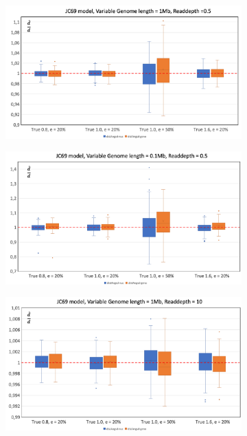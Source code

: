\documentclass{article}
\begin{document}
\begin{figure}
\begin{subfigure}{.5\textwidth}
  \centering
  \includegraphics[width=.99\linewidth]{BiasJCRD05_1M.png}  
  \caption{}
  \label{fig:BiasJCRD05_1M}
\end{subfigure}
\begin{subfigure}{.5\textwidth}
  \centering
  \includegraphics[width=.99\linewidth]{BiasJCRD05_01M.png}  
  \caption{}
  \label{fig:BiasJCRD05_01M}
\end{subfigure}
\newline
\begin{subfigure}{.5\textwidth}
  \centering
  \includegraphics[width=.99\linewidth]{BiasJCRD10_1M.png}  

\end{subfigure}
\end{figure}
\end{document}

